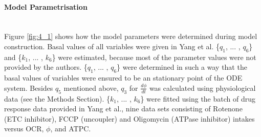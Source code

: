 \documentclass[12pt]{article}
\newcommand{\myparagraph}[1]{\paragraph{#1}\mbox{}\\}
\begin{document}
\myparagraph{Model Parametrisation}
Figure \ref{fig:4_1} shows how the model parameters were determined during model construction. Basal values of all variables were given in Yang et al. \{$q_1$, ... , $q_6$\} and \{$k_1$, ... , $k_6$\} were estimated, because most of the parameter values were not provided by the authors. \{$q_1$, ... , $q_6$\} were determined in such a way that the basal values of variables were ensured to be an stationary point of the ODE system. Besides $q_5$ mentioned above, $q_3$ for $\frac{d\phi}{dt}$ was calculated using physiological data (see the Methods Section). \{$k_1$, ... , $k_6$\} were fitted using the batch of drug response data provided in Yang et al., nine data sets consisting of Rotenone (ETC inhibitor), FCCP (uncoupler) and Oligomycin (ATPase inhibitor) intakes versus OCR, $\phi$, and ATPC.\begin{figure}[ht] 
  

\end{figure}
\end{document}
